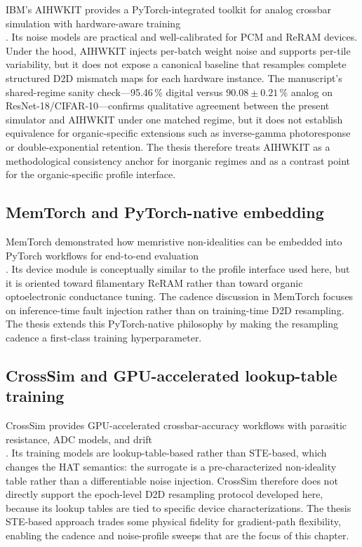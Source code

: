 IBM's AIHWKIT provides a PyTorch-integrated toolkit for analog crossbar simulation with hardware-aware training \\\citep{rasch2021aihwkit}. Its noise models are practical and well-calibrated for PCM and ReRAM devices. Under the hood, AIHWKIT injects per-batch weight noise and supports per-tile variability, but it does not expose a canonical baseline that resamples complete structured D2D mismatch maps for each hardware instance. The manuscript's shared-regime sanity check---95.46\,\% digital versus $90.08\pm0.21\,\%$ analog on ResNet-18/CIFAR-10---confirms qualitative agreement between the present simulator and AIHWKIT under one matched regime, but it does not establish equivalence for organic-specific extensions such as inverse-gamma photoresponse or double-exponential retention. The thesis therefore treats AIHWKIT as a methodological consistency anchor for inorganic regimes and as a contrast point for the organic-specific profile interface.

\subsection{MemTorch and PyTorch-native embedding}

MemTorch demonstrated how memristive non-idealities can be embedded into PyTorch workflows for end-to-end evaluation \\\citep{lammie2022memtorch}. Its device module is conceptually similar to the profile interface used here, but it is oriented toward filamentary ReRAM rather than toward organic optoelectronic conductance tuning. The cadence discussion in MemTorch focuses on inference-time fault injection rather than on training-time D2D resampling. The thesis extends this PyTorch-native philosophy by making the resampling cadence a first-class training hyperparameter.

\subsection{CrossSim and GPU-accelerated lookup-table training}

CrossSim provides GPU-accelerated crossbar-accuracy workflows with parasitic resistance, ADC models, and drift \\\citep{crosssim2026}. Its training models are lookup-table-based rather than STE-based, which changes the HAT semantics: the surrogate is a pre-characterized non-ideality table rather than a differentiable noise injection. CrossSim therefore does not directly support the epoch-level D2D resampling protocol developed here, because its lookup tables are tied to specific device characterizations. The thesis STE-based approach trades some physical fidelity for gradient-path flexibility, enabling the cadence and noise-profile sweeps that are the focus of this chapter.

